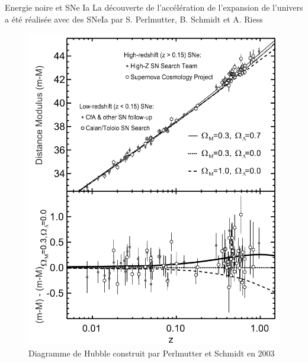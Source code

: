 \documentclass{beamer}
\begin{document}
\begin{frame}{Energie noire et SNe Ia}
	La découverte de l'accélération de l'expansion de l'univers a été réalisée avec des SNeIa par S. Perlmutter, B. Schmidt et A. Riess
	\begin{figure}
		\centering
		\includegraphics[height=0.5\textheight]{figures/Perlmutter_Schmidt.png}
		\caption{Diagramme de Hubble construit par Perlmutter et Schmidt en 2003}
	\end{figure}
\end{frame}

\end{document}
